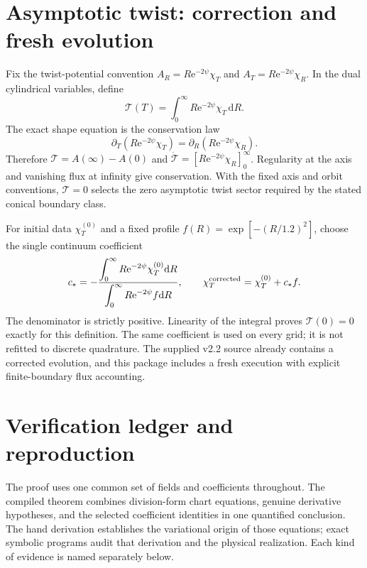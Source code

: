 \documentclass[11pt]{article}
\newcommand{\dd}{\mathrm d}
\newcommand{\e}{\mathrm e}
\begin{document}
\section{Asymptotic twist: correction and fresh evolution}\label{sec:twist}

Fix the twist-potential convention $A_R=R\e^{-2\psi}\chi_T$ and $A_T=R\e^{-2\psi}\chi_R$. In the dual cylindrical variables, define
\begin{equation}
 \mathcal T(T)=\int_0^\infty R\e^{-2\psi}\chi_T\,\dd R.
\end{equation}
The exact shape equation is the conservation law
\begin{equation}\label{eq:twistcons}
 \partial_T(R\e^{-2\psi}\chi_T)=\partial_R(R\e^{-2\psi}\chi_R).
\end{equation}
Therefore $\mathcal T=A(\infty)-A(0)$ and $\dot{\mathcal T}=[R\e^{-2\psi}\chi_R]_0^\infty$. Regularity at the axis and vanishing flux at infinity give conservation. With the fixed axis and orbit conventions, $\mathcal T=0$ selects the zero asymptotic twist sector required by the stated conical boundary class.

For initial data $\chi_T^{(0)}$ and a fixed profile $f(R)=\exp[-(R/1.2)^2]$, choose the single continuum coefficient
\begin{equation}\label{eq:cstar}
 c_*=-\frac{\displaystyle\int_0^\infty R\e^{-2\psi}\chi_T^{(0)}\dd R}
 {\displaystyle\int_0^\infty R\e^{-2\psi}f\dd R},\qquad
 \chi_T^{\rm corrected}=\chi_T^{(0)}+c_* f.
\end{equation}
The denominator is strictly positive. Linearity of the integral proves $\mathcal T(0)=0$ exactly for this definition. The same coefficient is used on every grid; it is not refitted to discrete quadrature. The supplied v2.2 source already contains a corrected evolution, and this package includes a fresh execution with explicit finite-boundary flux accounting.



\section{Verification ledger and reproduction}\label{sec:verification}

The proof uses one common set of fields and coefficients throughout. The compiled theorem combines division-form chart equations, genuine derivative hypotheses, and the selected coefficient identities in one quantified conclusion. The hand derivation establishes the variational origin of those equations; exact symbolic programs audit that derivation and the physical realization. Each kind of evidence is named separately below.
\end{document}
